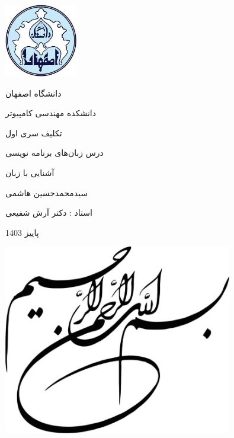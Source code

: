\documentclass[11pt, a4paper, oneside]{article}
\begin{document}
	\begin{titlepage}
		\centering
		\includegraphics[width=3.2cm, height=3.2cm]{images/logo}\par
		\vspace{5mm}
		{\LARGE دانشگاه اصفهان}\par
		\vspace{5mm}
		{\Large دانشکده مهندسی کامپیوتر}\par
		
		\vspace{2cm}
		
		{\Large تکلیف سری اول}\par
		
		\vspace{1cm}
		
		{\Large درس زبان‌های برنامه نویسی}\par
		
		\vspace{1cm}
		{\Huge آشنایی با زبان }\par
		
		
		\vspace{2cm}
		{\Large سیدمحمدحسین هاشمی}\par
		\vspace{1cm}
		{\large استاد : دکتر آرش شفیعی}\par

		\vspace{2cm}
		
		{\large پاییز 1403\par}
	\end{titlepage}
	
	\clearpage
	\begin{center}
		\includegraphics[width=10cm]{images/image002}
	\end{center}  
	\thispagestyle{plain}\mbox{} 
	\clearpage
	
\end{document}
